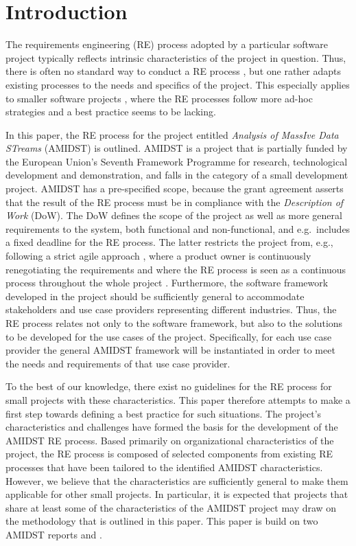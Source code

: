 \section{Introduction}

The requirements engineering (RE) process adopted by a particular software project typically reflects intrinsic
characteristics of the project in question. Thus, there is often no standard way to conduct a RE process \cite{Poh10},
but one rather adapts existing processes to the needs and specifics of the project. This especially applies to smaller
software projects \cite{Qui10,Ara07}, where the RE processes follow more ad-hoc strategies and a best practice seems to be lacking. 

In this paper, the RE process for the project entitled \emph{Analysis of MassIve Data STreams} (AMIDST) is outlined. AMIDST is a project that is partially funded by the European Union's Seventh Framework Programme for research, technological
development and demonstration, and falls in the category of a small development project. AMIDST has a pre-specified
scope, because the grant agreement asserts that the result of the RE process must be in compliance with the \emph{Description
  of Work} (DoW). The DoW defines the scope of the project as well as more general requirements to the system, both
functional and non-functional, and e.g.\ includes a fixed deadline for the RE process. The latter restricts the project from,
e.g., following a strict agile approach \cite{Din10},  where a product owner is continuously renegotiating the
requirements and where the RE process is seen as a continuous process throughout the whole project
\cite{Kav11}. Furthermore, the software framework developed in the project should be sufficiently general to accommodate
stakeholders and use case providers representing different industries. Thus, the RE process relates not only to the software framework, but also to the solutions to be developed
for the use cases of the project. Specifically, for each use case provider the general AMIDST framework will be instantiated in order
to meet the needs and requirements of that use case provider. 

To the best of our knowledge, there exist no guidelines for the RE process for small projects with these
characteristics. This paper therefore  attempts to make a first step towards defining a best practice for such
situations. The project's characteristics and challenges have formed the basis for the development of the AMIDST RE
process. Based primarily on organizational characteristics of the project, the RE process is composed of selected
components from existing RE processes that have been tailored to the identified AMIDST characteristics. However, we
believe that the characteristics are sufficiently general to make them applicable for other small projects. In particular, it is expected that projects that share at least some of the characteristics of the AMIDST project may draw on the methodology that is outlined in this paper.  This paper is build on two AMIDST reports \cite{Fer14} and \cite{Bor14}.

